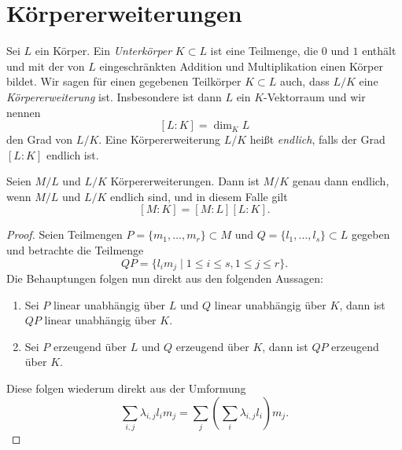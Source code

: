 \documentclass{book}
\begin{document}
\section{Körpererweiterungen}%
\label{sec:korpererweiterungen}

Sei $L$ ein Körper. Ein \emph{Unterkörper} $K \subset L$ ist eine Teilmenge,
die $0$ und $1$ enthält und mit der von $L$ eingeschränkten Addition und
Multiplikation einen Körper bildet. Wir sagen für einen gegebenen Teilkörper $K
\subset L$ auch, dass $L/K$ eine \emph{Körpererweiterung} ist. Insbesondere ist
dann $L$ ein $K$-Vektorraum und wir nennen
\[
    [L:K] = \dim_K L
\]
den Grad von $L/K$. Eine Körpererweiterung $L/K$ heißt \emph{endlich}, falls
der Grad $[L:K]$ endlich ist.

\begin{lem}
    \label{lem:grad}
    Seien $M/L$ und $L/K$ Körpererweiterungen. Dann ist $M/K$ genau dann endlich, wenn $M/L$ und $L/K$ endlich sind, und in diesem Falle gilt
    \[
        [M:K] = [M:L][L:K].
    \]
\end{lem}
\begin{proof}
    Seien Teilmengen $P=\{m_1, ..., m_r\} \subset M$ und $Q=\{l_1, ..., l_s \} \subset L$ gegeben und betrachte die Teilmenge 
    \[
        QP = \{l_i m_j\; | \; 1 \le i \le s, 1 \le j \le r\}.
    \]
    Die Behauptungen folgen nun direkt aus den folgenden Aussagen: 
    \begin{enumerate}
        \item Sei $P$ linear unabhängig über $L$ und $Q$ linear unabhängig über
            $K$, dann ist $QP$ linear unabhängig über $K$.
        \item Sei $P$ erzeugend über $L$ und $Q$ erzeugend über
            $K$, dann ist $QP$ erzeugend über $K$.
    \end{enumerate}
    Diese folgen wiederum direkt aus der Umformung
    \[
        \sum_{i,j} \lambda_{i,j} l_i m_j = \sum_j ( \sum_{i} \lambda_{i,j} l_i ) m_j .
    \]
\end{proof}
\end{document}

